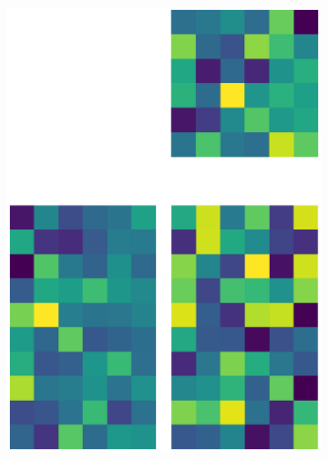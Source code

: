 \documentclass[10pt,twocolumn]{article}
\begin{document}
\begin{figure}[H]
\begin{subfigure}[t]{.15\textwidth}
\centering
\includegraphics[scale=.2]{DWGs/random-matrix-reconstruction-PCs-6.eps}
\caption{ }
\end{subfigure}
\begin{subfigure}[t]{.15\textwidth}
\centering

\end{subfigure}
\end{figure}
\end{document}

